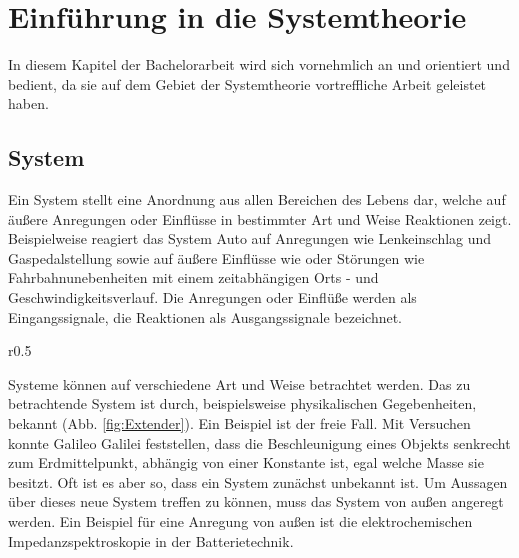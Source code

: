 \chapter{Einführung in die Systemtheorie}\label{systheo}

In diesem Kapitel der Bachelorarbeit wird sich vornehmlich an \cite{Dambrowski2013} und \cite{Polderman1997} orientiert und bedient, da sie auf dem Gebiet der Systemtheorie vortreffliche Arbeit geleistet haben. 

\section{System}\label{sys:einleitung}

Ein System stellt eine Anordnung aus allen Bereichen des Lebens dar, welche auf äußere Anregungen oder Einflüsse in bestimmter Art und Weise Reaktionen zeigt. 
Beispielweise reagiert das System Auto auf Anregungen wie Lenkeinschlag und Gaspedalstellung sowie auf äußere Einflüsse wie oder Störungen wie Fahrbahnunebenheiten mit einem zeitabhängigen Orts - und Geschwindigkeitsverlauf. Die Anregungen oder Einflüße werden als Eingangssignale, die Reaktionen als Ausgangssignale bezeichnet. \\
\begin{wrapfigure}{r}{0.5\textwidth}
  \def\svgwidth{0.40\columnwidth}
  \begin{center}
	
  \end{center}
  \caption{Der Aufhängepunkt $A$ des Pendels durch läuft eine Kreisbahn mit Radius $R$. Der Winkel $\beta$ wird durch die Regelung des Elektromotors festgelegt \cite{Kuypers2008}}
  \label{fig:Extender}
\end{wrapfigure}

Systeme können auf verschiedene Art und Weise betrachtet werden. Das zu betrachtende System ist durch, beispielsweise physikalischen Gegebenheiten, bekannt (Abb. \ref{fig:Extender}). Ein Beispiel ist der freie Fall. Mit Versuchen konnte Galileo Galilei feststellen, dass die Beschleunigung eines Objekts senkrecht zum Erdmittelpunkt, abhängig von einer Konstante ist, egal welche Masse sie besitzt. Oft ist es aber so, dass ein System zunächst unbekannt ist. Um Aussagen über dieses neue System treffen zu können, muss das System von außen angeregt werden. Ein Beispiel für eine Anregung von außen ist die elektrochemischen Impedanzspektroskopie in der Batterietechnik.

